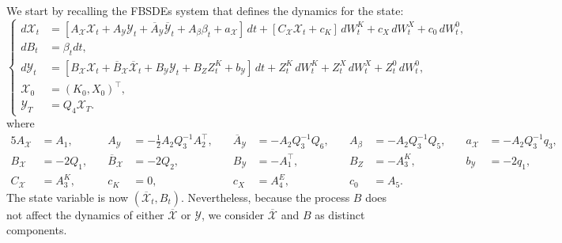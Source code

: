 \documentclass[11pt,twoside]{amsart}
\theoremstyle{definition}
\numberwithin{equation}{section}
\renewcommand{\bar}{\overline}
\begin{document}
We start by recalling the FBSDEs system that defines the dynamics for the state: 
\begin{equation}
\label{eqn: fbsde mf repr company}
\begin{cases}
d\mathcal{X}_t 
    &= [A_{\mathcal{X}} \mathcal{X}_t + A_{\mathcal{Y}} \mathcal{Y}_t + \overline{A}_{\mathcal{Y}} \overline{{\mathcal{Y}}}_t + A_\beta \beta_t + a_\mathcal{X}]\, dt + [C_{\mathcal{X}} \mathcal{X}_t + c_K]\,dW_t^{K} +c_X\,dW_t^{X} + c_0\,dW_t^{0}, \\
    dB_t &= \beta_t dt,\\
    d{\mathcal{Y}}_t &= [B_{\mathcal{X}} \mathcal{X}_t + \overline{B}_{\mathcal{X}} \overline{{\mathcal{X}}}_t + B_{\mathcal{Y}} {\mathcal{Y}}_t + B_Z {Z}^K_t + b_\mathcal{Y}]\,dt  + {Z}^K_t\,d{W}_t^{K} + {Z}^X_t\,dW_t^{X}+ {Z}^0_t\,dW_t^{0},\\
    {\mathcal{X}}_0 &= (K_0,X_0)^\top,\\
    {\mathcal{Y}}_T &= Q_4{\mathcal{X}}_T.
\end{cases}
\end{equation}
where
\begin{alignat*}{5}
    A_{\mathcal{X}} &= A_1, &\quad
    A_{\mathcal{Y}} &= -\tfrac{1}{2}A_2 Q_3^{-1} A_2^\top, &\quad
    \overline{A}_{\mathcal{Y}} &= -A_2Q_3^{-1}Q_6, &\quad
    A_\beta &= -A_2Q_3^{-1}Q_5, &\quad
    a_{\mathcal{X}} &= -A_2 Q_3^{-1}q_3, \\[6pt]
    B_{\mathcal{X}} &= -2Q_1, &\quad
    \overline{B}_{\mathcal{X}} &= -2Q_2, &\quad
    B_{\mathcal{Y}} &= -A_1^\top, &\quad
    B_Z &= -A_3^K,&\quad
    b_{\mathcal{Y}} &= -2q_1, \\[6pt]
    C_{\mathcal{X}} &= A_3^K, &\quad
    c_K &= 0, &\quad
    c_X &= A_4^E, &\quad
    c_0 &= A_5.
\end{alignat*}
The state variable is now $(\bar{\mathcal{X}}_t, B_t)$. Nevertheless, because the process $B$ does not affect the dynamics of either $\bar{\mathcal{X}}$ or $\mathcal{Y}$, we consider $\bar{\mathcal{X}}$ and $B$ as distinct components.
\end{document}
